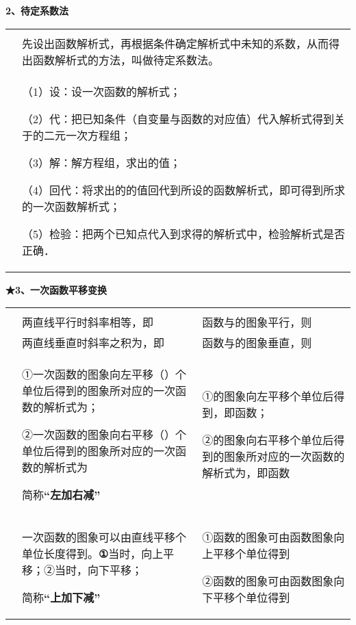 \documentclass[a4paper,11pt,UTF8]{ctexart}
\begin{document}
\textbf{2、待定系数法}

\begin{longtable}[]{@{}ll@{}}
\toprule
\endhead
&\tabularnewline
&
先设出函数解析式，再根据条件确定解析式中未知的系数，从而得出函数解析式的方法，叫做待定系数法。\tabularnewline
\begin{minipage}[t]{0.47\columnwidth}\raggedright
\strut
\end{minipage} & \begin{minipage}[t]{0.47\columnwidth}\raggedright
（1）设：设一次函数的解析式；

（2）代：把已知条件（自变量与函数的对应值）代入解析式得到关于的二元一次方程组；

（3）解：解方程组，求出的值；

（4）回代：将求出的的值回代到所设的函数解析式，即可得到所求的一次函数解析式；

（5）检验：把两个已知点代入到求得的解析式中，检验解析式是否正确．\strut
\end{minipage}\tabularnewline
\bottomrule
\end{longtable}

\textbf{★3、一次函数平移变换}

\begin{longtable}[]{@{}lll@{}}
\toprule
\endhead
& &\tabularnewline
& 两直线平行时斜率相等，即 & 函数与的图象平行，则\tabularnewline
& 两直线垂直时斜率之积为，即 & 函数与的图象垂直，则\tabularnewline
\begin{minipage}[t]{0.30\columnwidth}\raggedright
\strut
\end{minipage} & \begin{minipage}[t]{0.30\columnwidth}\raggedright
①一次函数的图象向左平移（）个单位后得到的图象所对应的一次函数的解析式为；

②一次函数的图象向右平移（）个单位后得到的图象所对应的一次函数的解析式为

简称\textbf{``左加右减''}\strut
\end{minipage} & \begin{minipage}[t]{0.30\columnwidth}\raggedright
①的图象向左平移个单位后得到，即函数；

②的图象向右平移个单位后得到的图象所对应的一次函数的解析式为，即函数\strut
\end{minipage}\tabularnewline
\begin{minipage}[t]{0.30\columnwidth}\raggedright
\strut
\end{minipage} & \begin{minipage}[t]{0.30\columnwidth}\raggedright
一次函数的图象可以由直线平移个单位长度得到。\textbf{①}当时，向上平移；②当时，向下平移；

简称\textbf{``上加下减''}\strut
\end{minipage} & \begin{minipage}[t]{0.30\columnwidth}\raggedright
①函数的图象可由函数图象向上平移个单位得到

②函数的图象可由函数图象向下平移个单位得到\strut
\end{minipage}\tabularnewline
\bottomrule
\end{longtable}
\end{document}
